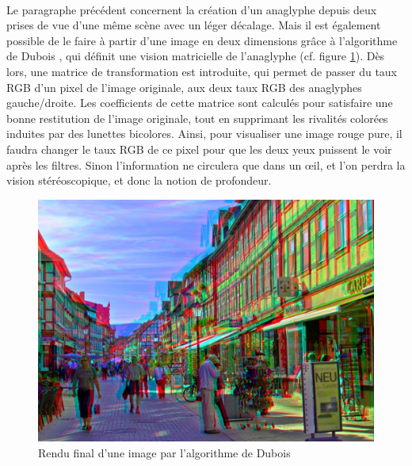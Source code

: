 \paragraph{}
	Le paragraphe précédent concernent la création d’un anaglyphe depuis deux prises de vue d’une même scène avec un léger décalage. Mais il est également possible de le faire à partir d’une image en deux dimensions grâce à l’algorithme de Dubois \cite{algoDubois}, qui définit une vision matricielle de l’anaglyphe (cf. figure \ref{fig:algoDubois}). Dès lors, une matrice de transformation est introduite, qui permet de passer du taux RGB d’un pixel de l’image originale,  aux deux taux RGB des anaglyphes gauche/droite. Les coefficients de cette matrice sont calculés pour satisfaire une bonne restitution de l’image originale, tout en supprimant les rivalités colorées induites par des lunettes bicolores. Ainsi, pour visualiser une image rouge pure, il faudra changer le taux RGB de ce pixel pour que les deux yeux puissent le voir après les filtres. Sinon l’information ne circulera que dans un œil, et l’on perdra la vision stéréoscopique, et donc la notion de profondeur. 
	
\begin{figure}[h]
		\centering
		\includegraphics[scale=1]{algoDubois.png}
		\caption{\label{fig:algoDubois} Rendu final d’une image par l’algorithme de Dubois \protect \footnotemark }
\end{figure}
	
	